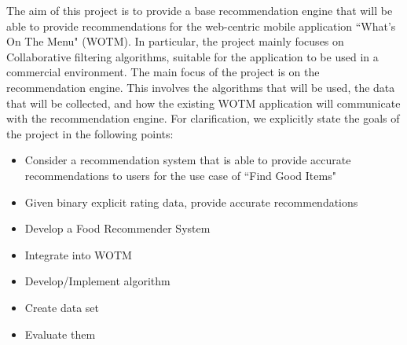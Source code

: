 The aim of this project is to provide a base recommendation engine that will be able to provide recommendations for the web-centric mobile application ``What's On The Menu" (WOTM). In particular, the project mainly focuses on Collaborative filtering algorithms, suitable for the application to be used in a commercial environment. The main focus of the project is on the recommendation engine. This involves the algorithms that will be used, the data that will be collected, and how the existing WOTM application will communicate with the recommendation engine. 
For clarification, we explicitly state the goals of the project in the following points:
\begin{itemize}
	\item{Consider a recommendation system that is able to provide accurate recommendations to users for the use case of ``Find Good Items"}
	\item{Given binary explicit rating data, provide accurate recommendations}
	\item{Develop a Food Recommender System}
	\item{Integrate into WOTM}
	\item{Develop/Implement algorithm}
	\item{Create data set}
	\item{Evaluate them}
\end{itemize}


